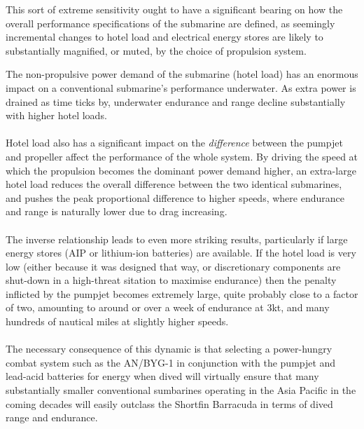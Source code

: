 \documentclass{article}\usepackage[]{graphicx}\usepackage[]{color}
\begin{document}
This sort of extreme sensitivity ought to have a significant bearing on how the overall performance specifications of the submarine are defined, as seemingly incremental changes to hotel load and electrical energy stores are likely to substantially magnified, or muted, by the choice of propulsion system.

\begin{tcolorbox}[width=0.8\textwidth, center, colback=blue!5!white,colframe=blue!75!black, title= What about hotel load and the system as a whole?]
The non-propulsive power demand of the submarine (hotel load) has an enormous impact on a conventional submarine's performance underwater. As extra power is drained as time ticks by, underwater endurance and range decline substantially with higher hotel loads.
\\
\\
Hotel load also has a significant impact on the \textit{difference} between the pumpjet and propeller affect the performance of the whole system. By driving the speed at which the propulsion becomes the dominant power demand higher, an extra-large hotel load reduces the overall difference between the two identical submarines, and pushes the peak proportional difference to higher speeds, where endurance and range is naturally lower due to drag increasing.
\\
\\
The inverse relationship leads to even more striking results, particularly if large energy stores (AIP or lithium-ion batteries) are available.  If the hotel load is very low (either because it was designed that way, or discretionary components are shut-down in a high-threat sitation to maximise endurance) then the penalty inflicted by the pumpjet becomes extremely large, quite probably close to a factor of two, amounting to around or over a week of endurance at 3kt, and many hundreds of nautical miles at slightly higher speeds.
\\
\\
The necessary consequence of this dynamic is that selecting a power-hungry combat system such as the AN/BYG-1 in conjunction with the pumpjet and lead-acid batteries for energy when dived will virtually ensure that many substantially smaller conventional sumbarines operating in the Asia Pacific in the coming decades will easily outclass the Shortfin Barracuda in terms of dived range and endurance.
\end{tcolorbox}
\end{document}
